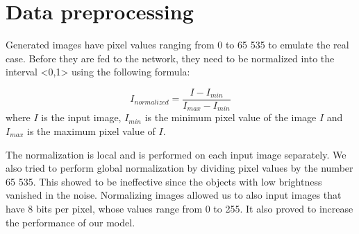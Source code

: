 \section{Data preprocessing}

Generated images have pixel values ranging from 0 to 65 535 to emulate the real case. Before they are fed to the network, they need to be normalized into the interval <0,1> using the following formula:

\begin{equation}
    I_{normalized} = \frac{I - I_{min}}{I_{max} - I_{min}}
\end{equation}
where $I$ is the input image, $I_{min}$ is the minimum pixel value of the image $I$ and $I_{max}$ is the maximum pixel value of $I$. 

The normalization is local and is performed on each input image separately. We also tried to perform global normalization by dividing pixel values by the number 65 535. This showed to be ineffective since the objects with low brightness vanished in the noise. 
Normalizing images allowed us to also input images that have 8 bits per pixel, whose values range from 0 to 255. It also proved to increase the performance of our model. 
